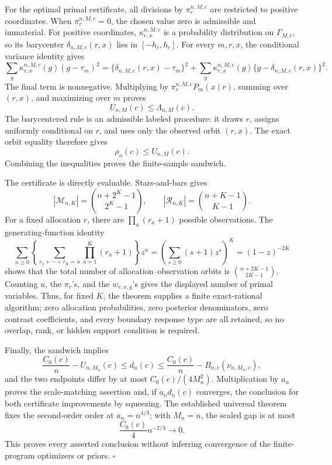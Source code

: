 For the optimal primal certificate, all divisions by \(\pi_r^{n,M,c}\) are restricted to positive coordinates.  When \(\pi_r^{n,M,c}=0\), the chosen value zero is admissible and immaterial.  For positive coordinates, \(\kappa_{r,x}^{n,M,c}\) is a probability distribution on \(\Gamma_{M,c}\), so its barycenter \(\delta_{n,M,c}(r,x)\) lies in \([-h_c,h_c]\).  For every \(m,r,x\), the conditional variance identity gives
\[
 \sum_g\kappa_{r,x}^{n,M,c}(g)(g-\tau_m)^2
 =\{\delta_{n,M,c}(r,x)-\tau_m\}^2
 +\sum_g\kappa_{r,x}^{n,M,c}(g)
 \{g-\delta_{n,M,c}(r,x)\}^2.
\]
The final term is nonnegative.  Multiplying by \(\pi_r^{n,M,c}P_m(x\mid r)\), summing over \((r,x)\), and maximizing over \(m\) proves
\[
 U_{n,M}(c)\leq\Lambda_{n,M}(c).
\]
The barycentered rule is an admissible labeled procedure: it draws \(r\), assigns uniformly conditional on \(r\), and uses only the observed orbit \((r,x)\).  The exact orbit equality therefore gives
\[
 \rho_n(c)\leq U_{n,M}(c).
\]
Combining the inequalities proves the finite-sample sandwich.

The certificate is directly evaluable.  Stars-and-bars gives
\[
 |\mathcal M_{n,K}|=\binom{n+2^K-1}{2^K-1},
 \qquad
 |\mathcal R_{n,K}|=\binom{n+K-1}{K-1}.
\]
For a fixed allocation \(r\), there are \(\prod_a(r_a+1)\) possible observations.  The generating-function identity
\[
 \sum_{n\geq0}\left\{
 \sum_{r_1+\cdots+r_K=n}\prod_{a=1}^K(r_a+1)
 \right\}z^n
 =\left(\sum_{s\geq0}(s+1)z^s\right)^K
 =(1-z)^{-2K}
\]
shows that the total number of allocation--observation orbits is \(\binom{n+2K-1}{2K-1}\).  Counting \(u\), the \(\pi_r\)'s, and the \(w_{r,x,g}\)'s gives the displayed number of primal variables.  Thus, for fixed \(K\), the theorem supplies a finite exact-rational algorithm; zero allocation probabilities, zero posterior denominators, zero contrast coefficients, and every boundary response type are all retained, so no overlap, rank, or hidden support condition is required.

Finally, the sandwich implies
\[
 \frac{C_0(c)}n-U_{n,M_n}(c)
 \leq d_n(c)
 \leq\frac{C_0(c)}n-B_{n,c}(\nu_{n,M_n,c}),
\]
and the two endpoints differ by at most \(C_0(c)/(4M_n^2)\).  Multiplication by \(a_n\) proves the scale-matching assertion and, if \(a_nd_n(c)\) converges, the conclusion for both certificate improvements by squeezing.  The established universal theorem fixes the second-order order at \(a_n=n^{4/3}\); with \(M_n=n\), the scaled gap is at most
\[
 \frac{C_0(c)}4n^{-2/3}\longrightarrow0.
\]
This proves every asserted conclusion without inferring convergence of the finite-program optimizers or priors. \(\square\)